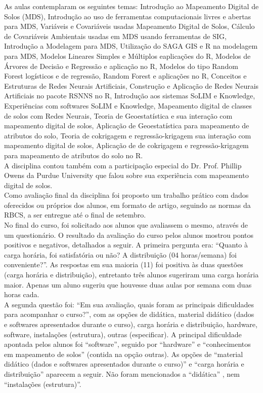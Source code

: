 \noindent As aulas contemplaram os seguintes temas: Introdução ao Mapeamento Digital de Solos (MDS), Introdução ao uso de ferramentas computacionais livres e abertas para MDS, Variáveis e Covariáveis usadas Mapeamento Digital de Solos, Cálculo de Covariáveis Ambientais usadas em MDS usando ferramentas de SIG, Introdução a Modelagem para MDS, Utilização do SAGA GIS e R na modelagem para MDS, Modelos Lineares Simples e Múltiplos eaplicações do R, Modelos de Árvores de Decisão e Regressão e aplicação no R, Modelos do tipo Random Forest logísticos e de regressão, Random Forest e aplicações no R, Conceitos e Estruturas de Redes Neurais Artificiais, Construção e Aplicação de Redes Neurais Artificiais no pacote RSNNS no R, Introdução aos sistemas SoLIM e Knowledge, Experiências com softwares SoLIM e Knowledge, Mapeamento digital de classes de solos com Redes Neurais, Teoria de Geoestatística e sua interação com mapeamento digital de solos, Aplicação de Geoestatística para mapeamento de atributos do solo, Teoria de cokrigagem 
e regressão-krigagem sua interação com mapeamento digital de solos, Aplicação de de cokrigagem e regressão-krigagem para mapeamento de atributos do solo no R.\\
A disciplina contou também com a participação especial do Dr. Prof. Phillip Owens da Purdue University  que falou sobre sua experiência com mapeamento digital de solos.\\
Como avaliação final da disciplina foi proposto um trabalho prático com dados oferecidos ou próprios dos alunos, em formato de artigo, seguindo as normas da RBCS, a ser entregue até o final de setembro.\\
No final do curso, foi solicitado aos alunos que avaliassem o mesmo, através de um questionário. O resultado da avaliação do curso pelos alunos  mostrou pontos positivos e negativos, detalhados a seguir. A primeira pergunta era: ``Quanto à carga horária, foi satisfatória ou não? A distribuição (04 horas/semana) foi conveniente?''. As respostas em sua maioria (11) foi positiva às duas questões (carga horária e distribuição), entretanto  três alunos sugeriram uma carga horária maior. Apenas um aluno sugeriu que houvesse duas aulas por semana com duas horas cada.\\
A segunda questão foi: ``Em sua avaliação, quais foram as principais dificuldades para acompanhar o curso?'', com as opções de didática, material didático (dados e softwares apresentados durante o curso), carga horária e distribuição, hardware, software, instalações (estrutura), outras (especificar).  A principal dificuldade apontada pelos alunos foi ``software'', seguido por ``hardware'' e ``conhecimentos em mapeamento de solos'' (contida na opção outras). As opções de ``material didático (dados e softwares apresentados durante o curso)'' e ``carga horária e distribuição'' aparecem a seguir. Não foram mencionados a ``didática'' , nem ``instalações (estrutura)''.\\
